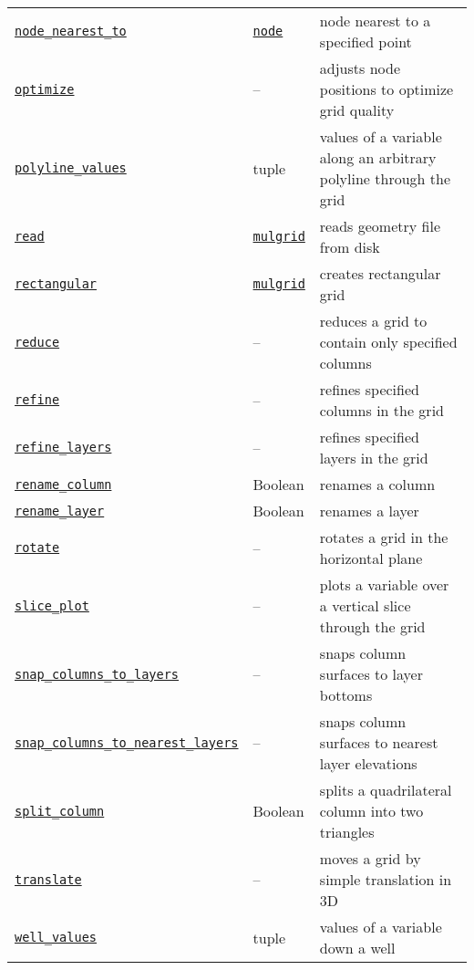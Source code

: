 \begin{center}
\begin{longtable}{|l|l|p{70mm}|}
  \hyperref[sec:mulgrid:node_nearest_to]{\texttt{node\_nearest\_to}} & \hyperref[nodeobjects]{\texttt{node}} & node nearest to a specified point\\ 
  \hyperref[sec:mulgrid:optimize]{\texttt{optimize}} & -- & adjusts node positions to optimize grid quality\\
  \hyperref[sec:mulgrid:polyline_values]{\texttt{polyline\_values}} & tuple & values of a variable along an arbitrary polyline through the grid\\
  \hyperref[sec:mulgrid:read]{\texttt{read}} & \hyperref[mulgrids]{\texttt{mulgrid}} & reads geometry file from disk\\
  \hyperref[sec:mulgrid:rectangular]{\texttt{rectangular}} & \hyperref[mulgrids]{\texttt{mulgrid}} & creates rectangular grid\\
  \hyperref[sec:mulgrid:reduce]{\texttt{reduce}} & -- & reduces a grid to contain only specified columns\\
  \hyperref[sec:mulgrid:refine]{\texttt{refine}} & -- & refines specified columns in the grid\\
  \hyperref[sec:mulgrid:refine_layers]{\texttt{refine\_layers}} & -- & refines specified layers in the grid\\
  \hyperref[sec:mulgrid:rename_column]{\texttt{rename\_column}} & Boolean & renames a column\\
  \hyperref[sec:mulgrid:rename_layer]{\texttt{rename\_layer}} & Boolean & renames a layer\\
  \hyperref[sec:mulgrid:rotate]{\texttt{rotate}} & -- & rotates a grid in the horizontal plane\\
  \hyperref[sec:mulgrid:slice_plot]{\texttt{slice\_plot}} & -- & plots a variable over a vertical slice through the grid\\
  \hyperref[sec:mulgrid:snap_columns_to_layers]{\texttt{snap\_columns\_to\_layers}} & -- & snaps column surfaces to layer bottoms\\
  \hyperref[sec:mulgrid:snap_columns_to_nearest_layers]{\texttt{snap\_columns\_to\_nearest\_layers}} & -- & snaps column surfaces to nearest layer elevations \\
  \hyperref[sec:mulgrid:split_column]{\texttt{split\_column}} & Boolean & splits a quadrilateral column into two triangles\\ 
  \hyperref[sec:mulgrid:translate]{\texttt{translate}} & -- & moves a grid by simple translation in 3D\\
  \hyperref[sec:mulgrid:well_values]{\texttt{well\_values}} & tuple & values of a variable down a well\\

\end{longtable}
\end{center}

